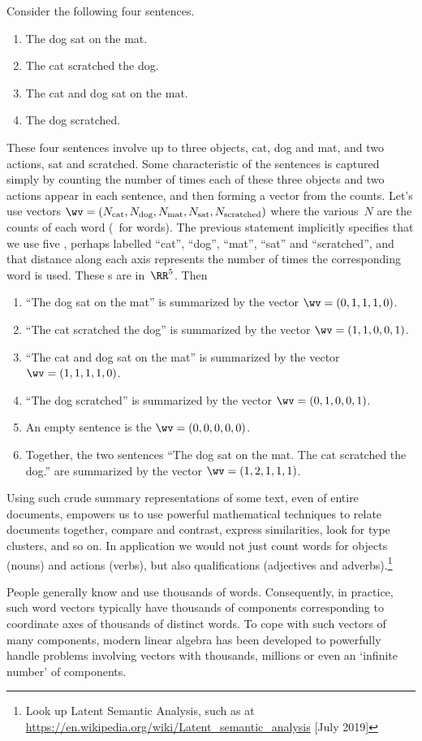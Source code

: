 \begin{example} \label{eg:deflsv}
Consider the following four sentences.
\begin{enumerate}
\item The dog sat on the mat.
\item The cat scratched the dog.
\item The cat and dog sat on the mat.
\item The dog scratched.
\end{enumerate}
These four sentences involve up to three objects, cat, dog and mat, and two actions, sat and scratched.  
Some characteristic of the sentences is captured simply by counting the number of times each of these three objects and two actions appear in each sentence, and then forming a vector from the counts.
Let's use vectors \(\wv=(N_{\text{cat}}, N_{\text{dog}}, N_{\text{mat}}, N_{\text{sat}}, N_{\text{scratched}})\) where the various~\(N\) are the counts of each word (\wv~for words). 
The previous statement implicitly specifies that we use five , perhaps labelled ``cat'', ``dog'', ``mat'', ``sat'' and ``scratched'', and that distance along each axis represents the number of times the corresponding word is used.
These s are in~\(\RR^5\).
Then
\begin{enumerate}
\item ``The dog sat on the mat'' is summarized by the vector \(\wv=(0,1,1,1,0)\).
\item ``The cat scratched the dog'' is summarized by the vector \(\wv=(1,1,0,0,1)\).
\item ``The cat and dog sat on the mat'' is summarized by the vector \(\wv=(1,1,1,1,0)\).
\item ``The dog scratched'' is summarized by the vector \(\wv=(0,1,0,0,1)\).
\item An empty sentence is the  \(\wv=(0,0,0,0,0)\).
\item Together, the two sentences ``The dog sat on the mat.
 The cat scratched the dog.'' are summarized by the vector \(\wv=(1,2,1,1,1)\).
\end{enumerate}
Using such crude summary representations of some text, even of entire documents, empowers us to use powerful mathematical techniques to relate documents together, compare and contrast, express similarities, look for type clusters, and so on.
In application we would not just count words for objects (nouns) and actions (verbs), but also qualifications (adjectives and adverbs).\footnote{Look up Latent Semantic Analysis, such as at \url{https://en.wikipedia.org/wiki/Latent_semantic_analysis} [July 2019]}

People generally know and use thousands of words.
Consequently, in practice, such word vectors typically have thousands of components corresponding to coordinate axes of thousands of distinct words.
To cope with such vectors of many components, modern linear algebra has been developed to powerfully handle problems involving vectors with thousands, millions or even an `infinite number' of components.
\end{example}

